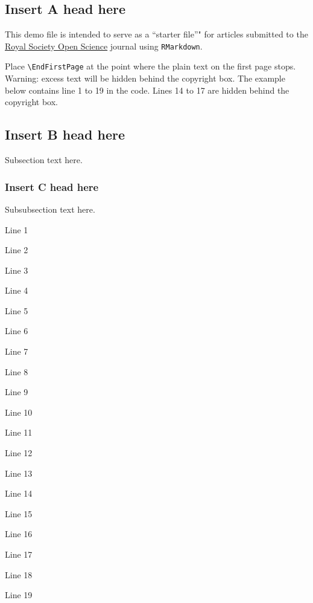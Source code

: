 \documentclass[]{rsos}%
\begin{document}
\begin{fmtext}

\hypertarget{insert-a-head-here}{%
\section{Insert A head here}\label{insert-a-head-here}}

This demo file is intended to serve as a ``starter file''" for articles submitted to the \href{http://rsos.royalsocietypublishing.org/}{Royal Society Open Science} journal using \texttt{RMarkdown}.

Place \texttt{\textbackslash{}EndFirstPage} at the point where the plain text on the first page stops. Warning: excess text will be hidden behind the copyright box. The example below contains line 1 to 19 in the code. Lines 14 to 17 are hidden behind the copyright box.

\hypertarget{insert-b-head-here}{%
\subsection{Insert B head here}\label{insert-b-head-here}}

Subsection text here.

\hypertarget{insert-c-head-here}{%
\subsubsection{Insert C head here}\label{insert-c-head-here}}

Subsubsection text here.

Line 1

Line 2

Line 3

Line 4

Line 5

Line 6

Line 7

Line 8

Line 9

Line 10

Line 11

Line 12

Line 13

Line 14

Line 15

Line 16

Line 17

Line 18

Line 19

\end{fmtext}
\maketitle
\end{document}
